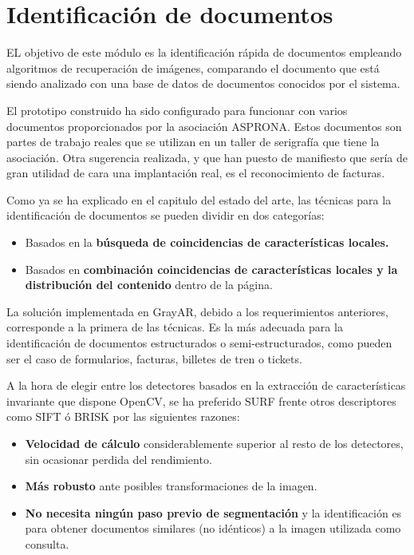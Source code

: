 \section{Identificación de documentos}
EL objetivo de este módulo es la identificación rápida de documentos empleando algoritmos de
recuperación de imágenes, comparando el documento que está siendo analizado con una base de datos de
documentos conocidos por el sistema.

El prototipo construido ha sido configurado para funcionar con varios documentos proporcionados
por la asociación ASPRONA. Estos documentos son partes de trabajo reales que se utilizan en un
taller de serigrafía que tiene la asociación. Otra sugerencia realizada, y que han puesto de
manifiesto que sería de gran utilidad de cara una implantación real, es el reconocimiento de facturas.

Como ya se ha explicado en el capitulo del estado del arte, las técnicas para la identificación de
documentos se pueden dividir en dos categorías:

\begin{itemize}
\item Basados en la \textbf{búsqueda de coincidencias de características locales.}
\item Basados en \textbf{combinación coincidencias de características locales y la distribución del contenido} dentro de la página.
\end{itemize}

La solución implementada en GrayAR, debido a los requerimientos anteriores, corresponde a la primera
de las técnicas. Es la más adecuada para la identificación de documentos estructurados o
semi-estructurados, como pueden ser el caso de formularios, facturas, billetes de tren o tickets.

A la hora de elegir entre los detectores basados en la extracción de características invariante que
dispone OpenCV, se ha preferido SURF frente otros descriptores como SIFT ó BRISK por las siguientes razones:

\begin{itemize}
\item \textbf{Velocidad de cálculo} considerablemente superior al resto de los detectores, sin ocasionar perdida del rendimiento.
\item \textbf{Más robusto} ante posibles transformaciones de la imagen.
\item \textbf{No necesita ningún paso previo de segmentación} y la identificación es para obtener documentos similares (no
idénticos) a la imagen utilizada como consulta.
\end{itemize}

